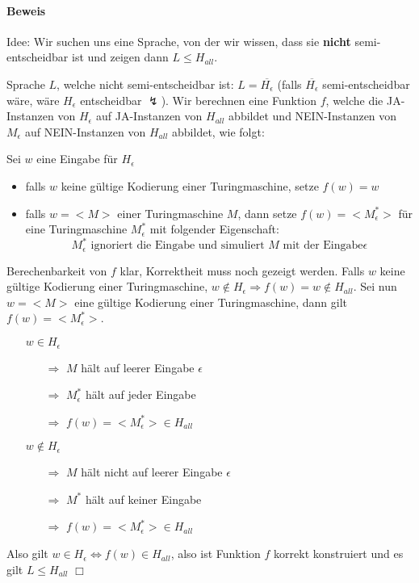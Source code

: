 \paragraph*{Beweis} Idee: Wir suchen uns eine Sprache, von der wir wissen, dass sie \textbf{nicht} semi-entscheidbar ist und zeigen dann $L \leq H_{all}$.

\para{} Sprache $L$, welche nicht semi-entscheidbar ist: $L=\overline{H_\epsilon}$ (falls $\overline{H_\epsilon}$ semi-entscheidbar wäre, wäre $H_\epsilon$ entscheidbar $\lightning$).
Wir berechnen eine Funktion $f$, welche die JA-Instanzen von $H_\epsilon$ auf JA-Instanzen von $H_{all}$ abbildet und NEIN-Instanzen von $M_\epsilon$ auf NEIN-Instanzen von $H_{all}$ abbildet, wie folgt:

\para{} Sei $w$ eine Eingabe für $H_\epsilon$
\begin{itemize}
	\item falls $w$ keine gültige Kodierung einer Turingmaschine, setze $f(w)=w$
	\item falls $w=<M>$ einer Turingmaschine $M$, dann setze $f(w)=<M_\epsilon^*>$ für eine Turingmaschine $M_\epsilon^*$ mit folgender Eigenschaft: $$ M_\epsilon^* \text{ ignoriert die Eingabe und simuliert } M \text{ mit der Eingabe} \epsilon $$
\end{itemize}
Berechenbarkeit von $f$ klar, Korrektheit muss noch gezeigt werden. Falls $w$ keine gültige Kodierung einer Turingmaschine, $w \not\in H_\epsilon \Rightarrow f(w)=w \not\in H_{all}$. Sei nun $w=<M>$ eine gültige Kodierung einer Turingmaschine, dann gilt $f(w)=<M_\epsilon^*>$.
\begin{itemize}
	\item[] $w \in H_\epsilon$
	\begin{itemize}
		\item[$\Rightarrow$] $M$ hält auf leerer Eingabe $\epsilon$
		\item[$\Rightarrow$] $M_\epsilon^*$ hält auf jeder Eingabe
		\item[$\Rightarrow$] $f(w)=<M_\epsilon^*> \in H_{all}$
	\end{itemize}
	\item[] $w \not\in H_\epsilon$
	\begin{itemize}
		\item[$\Rightarrow$] $M$ hält nicht auf leerer Eingabe $\epsilon$
		\item[$\Rightarrow$] $M^*$ hält auf keiner Eingabe
		\item[$\Rightarrow$] $f(w)=<M_\epsilon^*> \in H_{all}$
	\end{itemize}
\end{itemize}
Also gilt $w \in H_\epsilon \Leftrightarrow f(w) \in H_{all}$, also ist Funktion $f$ korrekt konstruiert und es gilt $L \leq H_{all}$ $\Box$